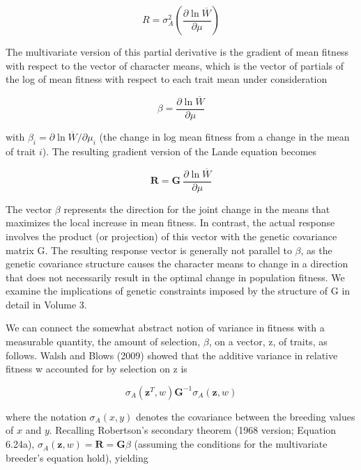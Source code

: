 \documentclass{article}
\begin{document}
\begin{equation}
R=\sigma_{A}^{2}\left(\frac{\partial\ln\overline{W}}{\partial\mu}\right)
\tag{13.27a}
\label{eq:13_27a}
\end{equation}

The multivariate version of this partial derivative is the gradient of mean fitness with respect to the vector of character means, which is the vector of partials of the log of mean fitness with respect to each trait mean under consideration

\begin{equation}
\beta=\frac{\partial\ln\overline{W}}{\partial\mu}
\tag{13.27b}
\label{eq:13_27b}
\end{equation}

with  $ \beta_i = \partial \ln \overline{W} / \partial \mu_i $ (the change in log mean fitness from a change in the mean of trait  $ i $). The resulting gradient version of the Lande equation becomes

\begin{equation}
\mathbf{R}=\mathbf{G}\ \frac{\partial\ln\overline{W}}{\partial\mu}
\tag{13.27c}
\label{eq:13_27c}
\end{equation}

The vector  $ \beta $ represents the direction for the joint change in the means that maximizes the local increase in mean fitness. In contrast, the actual response involves the product (or projection) of this vector with the genetic covariance matrix G. The resulting response vector is generally not parallel to  $ \beta $, as the genetic covariance structure causes the character means to change in a direction that does not necessarily result in the optimal change in population fitness. We examine the implications of genetic constraints imposed by the structure of G in detail in Volume 3.

We can connect the somewhat abstract notion of variance in fitness with a measurable quantity, the amount of selection,  $ \beta $, on a vector, z, of traits, as follows. Walsh and Blows (2009) showed that the additive variance in relative fitness w accounted for by selection on z is

\begin{equation}
\sigma_{A}(\mathbf{z}^{T},w)\mathbf{G}^{-1}\sigma_{A}(\mathbf{z},w)
\tag{13.28a}
\label{eq:13_28a}
\end{equation}

where the notation  $ \sigma_A(x, y) $ denotes the covariance between the breeding values of  $ x $ and  $ y $. Recalling Robertson's secondary theorem (1968 version; Equation 6.24a),  $ \sigma_A(\mathbf{z}, w) = \mathbf{R} = \mathbf{G}\beta $ (assuming the conditions for the multivariate breeder's equation hold), yielding
\end{document}
